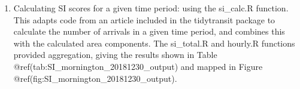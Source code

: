 \documentclass[preprint, 3p,
authoryear]{elsarticle} %
\providecommand{\tightlist}{%
  \setlength{\itemsep}{0pt}\setlength{\parskip}{0pt}}
\begin{document}
\begin{enumerate}
\def\labelenumi{(\arabic{enumi})}
\setcounter{enumi}{3}
\tightlist
\item
  Calculating SI scores for a given time period: using the si\_calc.R
  function. This adapts code from an article included in the tidytransit
  package \citep{tidytransit_departure_timetable} to calculate the
  number of arrivals in a given time period, and combines this with the
  calculated area components. The si\_total.R and hourly.R functions
  provided aggregation, giving the results shown in Table
  @ref(tab:SI\_mornington\_20181230\_output) and mapped in Figure
  @ref(fig:SI\_mornington\_20181230\_output).
\end{enumerate}

\begin{table}


\end{table}
\end{document}
